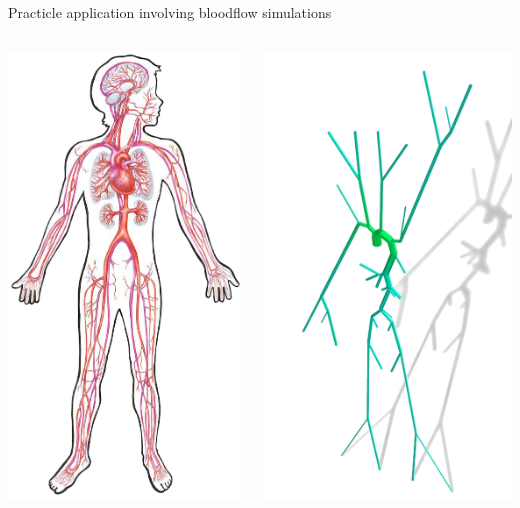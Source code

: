 \documentclass{beamer}
\begin{document}
\begin{frame}[fragile]{Practicle application involving bloodflow
    simulations}{}
    \begin{columns}
        \begin{center}
    \includegraphics[width=.6\textwidth]{ntnu/arterialHumanPicture.png}
        \end{center}
        \begin{center}
    \includegraphics[width=.6\textwidth]{ntnu/arterialTreeMascot3D.png}

\end{center}
\end{columns}
\end{frame}
\end{document}
